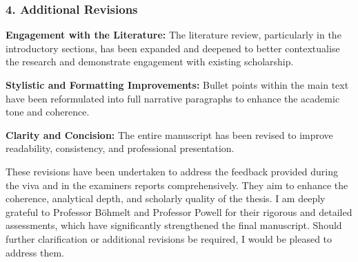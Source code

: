 \documentclass[
  12pt,
  letterpaper,
  DIV=11,
  numbers=noendperiod]{scrartcl}
\begin{document}
\subsubsection{4. Additional Revisions}\label{additional-revisions}

\textbf{Engagement with the Literature:} The literature review,
particularly in the introductory sections, has been expanded and
deepened to better contextualise the research and demonstrate engagement
with existing scholarship.

\textbf{Stylistic and Formatting Improvements:} Bullet points within the
main text have been reformulated into full narrative paragraphs to
enhance the academic tone and coherence.

\textbf{Clarity and Concision:} The entire manuscript has been revised
to improve readability, consistency, and professional presentation.

These revisions have been undertaken to address the feedback provided
during the viva and in the examiners reports comprehensively. They aim
to enhance the coherence, analytical depth, and scholarly quality of the
thesis. I am deeply grateful to Professor Böhmelt and Professor Powell
for their rigorous and detailed assessments, which have significantly
strengthened the final manuscript. Should further clarification or
additional revisions be required, I would be pleased to address them.
\end{document}
